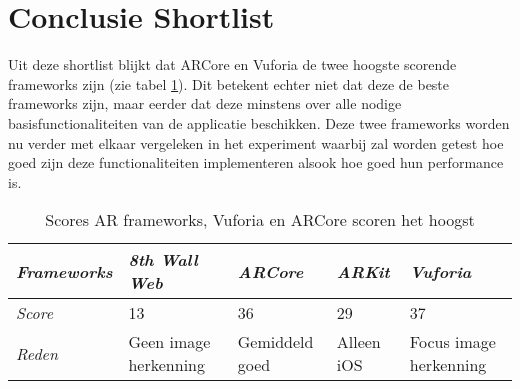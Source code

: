 \section{Conclusie Shortlist}
Uit deze shortlist blijkt dat ARCore en Vuforia de twee hoogste scorende frameworks zijn (zie tabel \ref{tbl:arscore}). Dit betekent echter niet dat deze de beste frameworks zijn, maar eerder dat deze minstens over alle nodige basisfunctionaliteiten van de applicatie beschikken. Deze twee frameworks worden nu verder met elkaar vergeleken in het experiment waarbij zal worden getest hoe goed zijn deze functionaliteiten implementeren alsook hoe goed hun performance is.
\begin{table}[]
    \centering
    \begin{tabular}{@{}lllll@{}}
        \toprule
        \textit{Frameworks} & \textit{8th Wall Web} & \textit{ARCore} & \textit{ARKit} & \textit{Vuforia}       \\ \midrule
        \textit{Score}      & 13                    & 36              & 29             & 37                     \\
        \textit{Reden}      & Geen image herkenning & Gemiddeld goed  & Alleen iOS     & Focus image herkenning \\ \bottomrule
    \end{tabular}
    \caption{Scores AR frameworks, Vuforia en ARCore scoren het hoogst}
    \label{tbl:arscore}
\end{table}